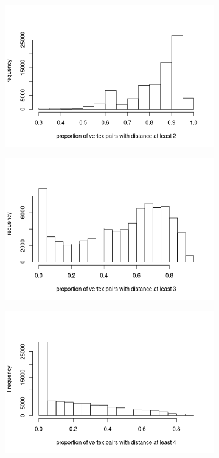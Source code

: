 \documentclass{l4proj}
\theoremstyle{definition}
\theoremstyle{remark}
\begin{document}
\begin{figure}
  \centering
  \begin{subfigure}[t]{0.49\textwidth}
    \centering
    \includegraphics[width=\textwidth]{images/mcs_prop2.png}
  \end{subfigure}
  \begin{subfigure}[t]{0.49\textwidth}
    \centering
    \includegraphics[width=\textwidth]{images/mcs_prop3.png}
  \end{subfigure}
  \begin{subfigure}[t]{0.49\textwidth}
    \centering
    \includegraphics[width=\textwidth]{images/mcs_prop4.png}

\end{subfigure}
\end{figure}
\end{document}
